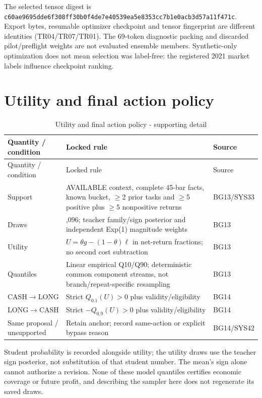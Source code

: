 \endgroup

The selected tensor digest is
\texttt{c60ae969\allowbreak{}5dde6f30\allowbreak{}8ff30b0f\allowbreak{}4de7e405\allowbreak{}39ea5e83\allowbreak{}53cc7b1e\allowbreak{}0acb3d57\allowbreak{}a11f471c}.
Export bytes, resumable optimizer checkpoint and tensor fingerprint are
different identities (TR04/TR07/TR01). The 69-token diagnostic packing
and discarded pilot/preflight weights are not evaluated ensemble members.
Synthetic-only optimization does not mean selection was label-free:
the registered 2021 market labels influence checkpoint ranking.

\section{Utility and final action policy}\label{s:8cc0958a350eab12}

\begingroup
\small
{}
\setlength{\tabcolsep}{3pt}

\begin{longtable}[]{@{}
  >{\raggedright\arraybackslash}p{}
  >{\raggedright\arraybackslash}p{}
  >{\raggedright\arraybackslash}p{}@{}}
\caption{Utility and final action policy - supporting detail}\label{tab:C_configuration:9}\tabularnewline
\toprule\noalign{}
Quantity / condition
 & Locked rule
 & Source
 \\
\midrule\noalign{}
\endfirsthead
\toprule\noalign{}
Quantity / condition
 & Locked rule
 & Source
 \\
\midrule\noalign{}
\endhead
\bottomrule\noalign{}
\endlastfoot
Support & AVAILABLE context, complete 45-bar facts, known bucket, \ensuremath{\geq}2 prior tasks and \ensuremath{\geq}5 positive plus \ensuremath{\geq}5 nonpositive returns & BG13/SYS33 \\
Draws & 4,096; teacher family/sign posterior and independent Exp(1) magnitude weights & BG13 \\
Utility & \(U=\theta g-(1-\theta)\ell\) in net-return fractions; no second cost subtraction & BG13 \\
Quantiles & Linear empirical Q10/Q90; deterministic common component streams, not branch/repeat-specific resampling & BG13 \\
CASH\ensuremath{\rightarrow}LONG & Strict \(Q_{0.1}(U)>0\) plus validity/eligibility & BG14 \\
LONG\ensuremath{\rightarrow}CASH & Strict \(-Q_{0.9}(U)>0\) plus validity/eligibility & BG14 \\
Same proposal / unsupported & Retain anchor; record same-action or explicit bypass reason & BG14/SYS42 \\
\end{longtable}

\endgroup

Student probability is recorded alongside utility; the utility draws use
the teacher sign posterior, not substitution of that student number.
The mean's sign alone cannot authorize a revision. None of these model
quantiles certifies economic coverage or future profit, and describing
the sampler here does not regenerate its saved draws.
